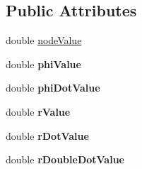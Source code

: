 \subsection*{Public Attributes}
\begin{DoxyCompactItemize}
\item 
double \hyperlink{class_c_p_g_node_acbbfdd599bfd15220fe953961fbfeb4f}{node\-Value}
\item 
\hypertarget{class_c_p_g_node_aa78a7c6a052337f4aedd24a17631ca68}{double {\bfseries phi\-Value}}\label{class_c_p_g_node_aa78a7c6a052337f4aedd24a17631ca68}

\item 
\hypertarget{class_c_p_g_node_a1dcc093938b76e7452249a0ab96d1f13}{double {\bfseries phi\-Dot\-Value}}\label{class_c_p_g_node_a1dcc093938b76e7452249a0ab96d1f13}

\item 
\hypertarget{class_c_p_g_node_a686774449adce8301c34aaa3456f412d}{double {\bfseries r\-Value}}\label{class_c_p_g_node_a686774449adce8301c34aaa3456f412d}

\item 
\hypertarget{class_c_p_g_node_a62b80cd976bcb47a9e4b85304b6b7e72}{double {\bfseries r\-Dot\-Value}}\label{class_c_p_g_node_a62b80cd976bcb47a9e4b85304b6b7e72}

\item 
\hypertarget{class_c_p_g_node_a062e5842b689b52ad1302de9e7b8308e}{double {\bfseries r\-Double\-Dot\-Value}}\label{class_c_p_g_node_a062e5842b689b52ad1302de9e7b8308e}

\end{DoxyCompactItemize}
